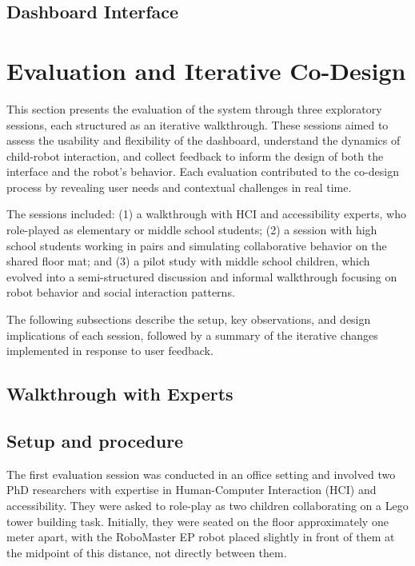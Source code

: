 \documentclass[a4paper]{usiinfbachelorproject}
\begin{document}
\subsection{\textbf{Dashboard Interface}}

\section{\textbf{Evaluation and Iterative Co-Design}}\label{sec:evaluation}
This section presents the evaluation of the system through three exploratory sessions, each structured as an iterative walkthrough.
These sessions aimed to assess the usability and flexibility of the dashboard, understand the dynamics of child-robot interaction, and collect feedback to inform the design of both the interface and the robot's behavior.
Each evaluation contributed to the co-design process by revealing user needs and contextual challenges in real time.

The sessions included:
(1) a walkthrough with HCI and accessibility experts, who role-played as elementary or middle school students;
(2) a session with high school students working in pairs and simulating collaborative behavior on the shared floor mat; and
(3) a pilot study with middle school children, which evolved into a semi-structured discussion and informal walkthrough focusing on robot behavior and social interaction patterns.

The following subsections describe the setup, key observations, and design implications of each session, followed by a summary of the iterative changes implemented in response to user feedback.


\subsection{\textbf{Walkthrough with Experts}}
\subsection*{\textbf{Setup and procedure}}
The first evaluation session was conducted in an office setting and involved two PhD researchers with expertise in Human-Computer Interaction (HCI) and accessibility.
They were asked to role-play as two children collaborating on a Lego tower building task.
Initially, they were seated on the floor approximately one meter apart, with the RoboMaster EP robot placed slightly in front of them at the midpoint of this distance, not directly between them.
\end{document}
